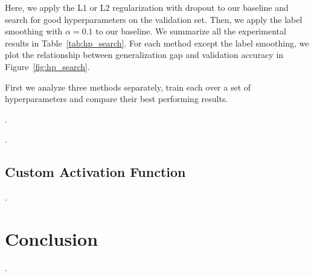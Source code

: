 \documentclass{article}
\begin{document}
Here, we apply the L1 or L2 regularization with dropout to our baseline and search for good hyperparameters on the validation set. 
Then, we apply the label smoothing with $\alpha=0.1$ to our baseline.
We summarize all the experimental results in Table~\ref{tab:hp_search}. For each method except the label smoothing, we plot the relationship between generalization gap and validation accuracy in Figure~\ref{fig:hp_search}.

First we analyze three methods separately, train each over a set of hyperparameters and compare their best performing results.

\questionSeven.

\questionEight.

\subsection{Custom Activation Function}

\questionNine.

\section{Conclusion}
\label{sec:concl}
    
\questionTen.

\newpage

\end{document}
